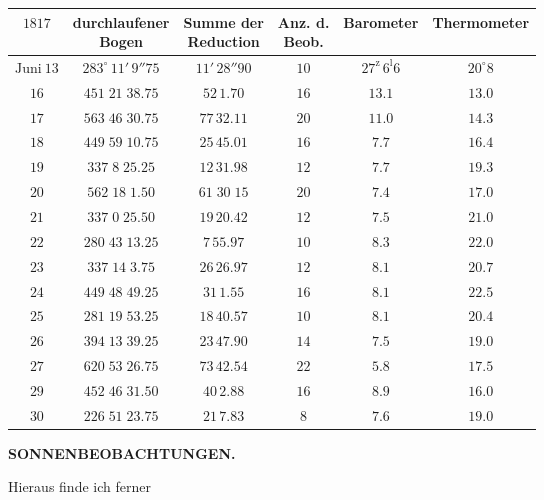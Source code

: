 \begin{center}\fontsize{9}{11}\selectfont\setlength{\tabcolsep}{3pt}\begin{tabular}{c|c|c|c|c|c}
$1817$ & \shortstack{durchlaufener\\Bogen} & \shortstack{Summe der\\Reduction} & \shortstack{Anz. d.\\Beob.} & Barometer & Thermometer\\
\hline$\text{Juni}\ 13$ & $283^\circ\,11'\,9''75$ & $11'\,28''90$ & $10$ & $27^{\mathrm z}\,6^{\mathrm l}6$ & $20^\circ8$\\
$16$ & $451\;21\;38.75$ & $52\,1.70$ & $16$ & $13.1$ & $13.0$\\
$17$ & $563\;46\;30.75$ & $77\,32.11$ & $20$ & $11.0$ & $14.3$\\
$18$ & $449\;59\;10.75$ & $25\,45.01$ & $16$ & $7.7$ & $16.4$\\
$19$ & $337\;8\;25.25$ & $12\,31.98$ & $12$ & $7.7$ & $19.3$\\
$20$ & $562\;18\;1.50$ & $61\;30\;15$ & $20$ & $7.4$ & $17.0$\\
$21$ & $337\;0\;25.50$ & $19\,20.42$ & $12$ & $7.5$ & $21.0$\\
$22$ & $280\;43\;13.25$ & $7\,55.97$ & $10$ & $8.3$ & $22.0$\\
$23$ & $337\;14\;3.75$ & $26\,26.97$ & $12$ & $8.1$ & $20.7$\\
$24$ & $449\;48\;49.25$ & $31\,1.55$ & $16$ & $8.1$ & $22.5$\\
$25$ & $281\;19\;53.25$ & $18\,40.57$ & $10$ & $8.1$ & $20.4$\\
$26$ & $394\;13\;39.25$ & $23\,47.90$ & $14$ & $7.5$ & $19.0$\\
$27$ & $620\;53\;26.75$ & $73\,42.54$ & $22$ & $5.8$ & $17.5$\\
$29$ & $452\;46\;31.50$ & $40\,2.88$ & $16$ & $8.9$ & $16.0$\\
$30$ & $226\;51\;23.75$ & $21\,7.83$ & $8$ & $7.6$ & $19.0$\\
\end{tabular}\end{center}

\clearpage
\thispagestyle{empty}
\noindent{}%
\makebox[12mm][l]{}%
\parbox[t]{\dimexpr\linewidth-24mm\relax}{\centering\footnotesize\bfseries SONNENBEOBACHTUNGEN.\par}%
\par\nobreak\medskip
{}\par\indent Hieraus finde ich ferner

